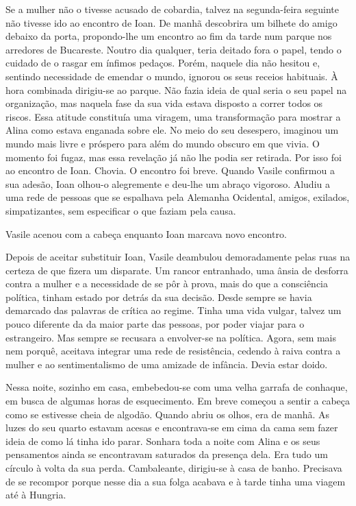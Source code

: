 Se a mulher não o tivesse acusado de cobardia, talvez na segunda-feira
seguinte não tivesse ido ao encontro de Ioan. De manhã descobrira um
bilhete do amigo debaixo da porta, propondo-lhe um encontro ao fim da
tarde num parque nos arredores de Bucareste. Noutro dia qualquer, teria
deitado fora o papel, tendo o cuidado de o rasgar em ínfimos pedaços.
Porém, naquele dia não hesitou e, sentindo necessidade de emendar o
mundo, ignorou os seus receios habituais. À hora combinada dirigiu-se ao
parque. Não fazia ideia de qual seria o seu papel na organização,
mas naquela fase da sua vida estava disposto a correr todos os riscos.
Essa atitude constituía uma viragem, uma transformação para mostrar a
Alina como estava enganada sobre ele. No meio do seu desespero,
imaginou um mundo mais livre e próspero para além do mundo obscuro em
que vivia. O momento foi fugaz, mas essa revelação já não lhe podia ser
retirada. Por isso foi ao encontro de Ioan. Chovia. O encontro foi
breve. Quando Vasile confirmou a sua adesão, Ioan olhou-o alegremente
e deu-lhe um abraço vigoroso. Aludiu a uma rede de pessoas que se
espalhava pela Alemanha Ocidental, amigos, exilados, simpatizantes, sem
especificar o que faziam pela causa.

Vasile acenou com a cabeça enquanto Ioan marcava novo encontro.

Depois de aceitar substituir Ioan, Vasile deambulou demoradamente pelas
ruas na certeza de que fizera um disparate. Um rancor entranhado, uma
ânsia de desforra contra a mulher e a necessidade de se pôr à prova,
mais do que a consciência política, tinham estado por detrás da sua
decisão. Desde sempre se havia demarcado das palavras de crítica ao
regime. Tinha uma vida vulgar, talvez um pouco diferente da da maior
parte das pessoas, por poder viajar para o estrangeiro. Mas sempre se
recusara a envolver-se na política. Agora, sem mais nem porquê, aceitava
integrar uma rede de resistência, cedendo à raiva contra a mulher e ao
sentimentalismo de uma amizade de infância. Devia estar doido.

Nessa noite, sozinho em casa, embebedou-se com uma velha garrafa de
conhaque, em busca de algumas horas de esquecimento. Em breve começou a
sentir a cabeça como
se estivesse cheia de algodão. Quando abriu os olhos, era de manhã. As
luzes do seu quarto estavam acesas e encontrava-se em cima da cama sem
fazer ideia de como lá tinha ido parar. Sonhara toda a noite com Alina e
os seus pensamentos ainda se encontravam saturados da presença dela. Era
tudo um círculo à volta da sua perda. Cambaleante, dirigiu-se à casa
de banho. Precisava de se recompor porque nesse dia a sua folga
acabava e à tarde tinha uma viagem até à Hungria.


